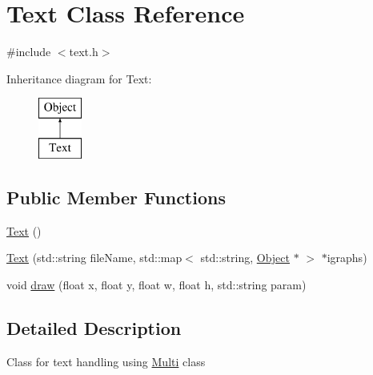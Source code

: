 \hypertarget{class_text}{\section{Text Class Reference}
\label{class_text}
}


{\ttfamily \#include $<$text.\-h$>$}

Inheritance diagram for Text\-:\begin{figure}[H]
\begin{center}
\leavevmode
\includegraphics[height=2.000000cm]{class_text}
\end{center}
\end{figure}
\subsection*{Public Member Functions}
\begin{DoxyCompactItemize}
\item 
\hyperlink{class_text_ab3e26143fccc52699bcc5149cae852bc}{Text} ()
\item 
\hyperlink{class_text_ae78dd646ae9f0380530e4b1e39da7212}{Text} (std\-::string file\-Name, std\-::map$<$ std\-::string, \hyperlink{class_object}{Object} $\ast$ $>$ $\ast$igraphs)
\item 
void \hyperlink{class_text_a7eb6b5f04d40c5f3f482413612d0a101}{draw} (float x, float y, float w, float h, std\-::string param)
\end{DoxyCompactItemize}


\subsection{Detailed Description}
Class for text handling using \hyperlink{class_multi}{Multi} class 

